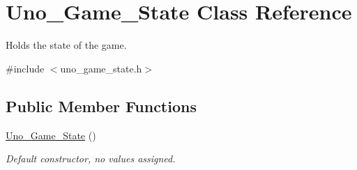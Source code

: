 \hypertarget{class_uno___game___state}{
\section{\-Uno\-\_\-\-Game\-\_\-\-State \-Class \-Reference}
\label{class_uno___game___state}
}


\-Holds the state of the game.  




{\ttfamily \#include $<$uno\-\_\-game\-\_\-state.\-h$>$}

\subsection*{\-Public \-Member \-Functions}
\begin{DoxyCompactItemize}
\item 
\hypertarget{class_uno___game___state_a8c17d72f7a46910c00e916e5df76f7f5}{
\hyperlink{class_uno___game___state_a8c17d72f7a46910c00e916e5df76f7f5}{\-Uno\-\_\-\-Game\-\_\-\-State} ()}
\label{class_uno___game___state_a8c17d72f7a46910c00e916e5df76f7f5}

\begin{DoxyCompactList}\small\item\em \-Default constructor, no values assigned. \end{DoxyCompactList}\end{DoxyCompactItemize}
